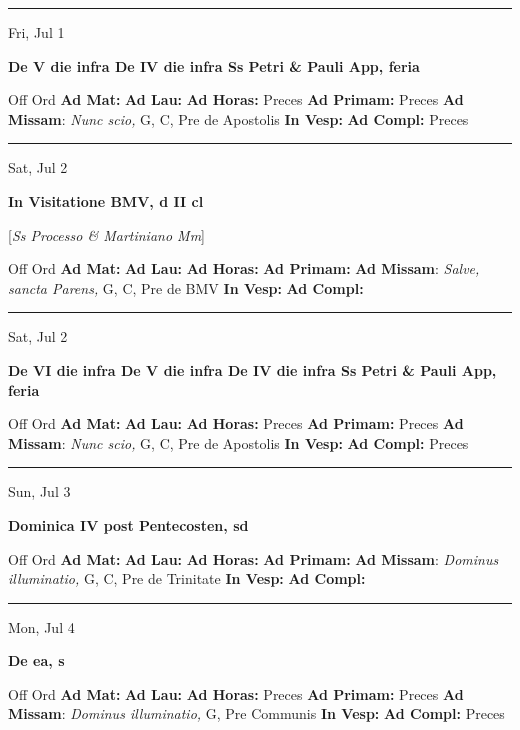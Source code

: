 \documentclass[letterpaper, 10pt]{article}
\begin{document}
\hrule
\begin{center}
Fri, Jul 1
\end{center}\textbf{ \large De V die infra De IV die infra Ss Petri \& Pauli App, \textnormal{\normalsize feria}}
\begin{justify}
Off Ord
\textbf{Ad Mat: }
\textbf{Ad Lau: }
\textbf{Ad Horas: }Preces
\textbf{Ad Primam: }Preces
\textbf{Ad Missam}: \textit{Nunc scio,} G, C, Pre de Apostolis
\textbf{In Vesp: }
\textbf{Ad Compl: }Preces\end{justify}



\hrule
\begin{center}
Sat, Jul 2
\end{center}\textbf{ \large In Visitatione BMV, \textnormal{\normalsize d II cl}}

[\textit{Ss Processo \& Martiniano Mm}]
\begin{justify}
Off Ord
\textbf{Ad Mat: }
\textbf{Ad Lau: }
\textbf{Ad Horas: }
\textbf{Ad Primam: }
\textbf{Ad Missam}: \textit{Salve, sancta Parens,} G, C, Pre de BMV
\textbf{In Vesp: }
\textbf{Ad Compl: }\end{justify}



\hrule
\begin{center}
Sat, Jul 2
\end{center}\textbf{ \large De VI die infra De V die infra De IV die infra Ss Petri \& Pauli App, \textnormal{\normalsize feria}}
\begin{justify}
Off Ord
\textbf{Ad Mat: }
\textbf{Ad Lau: }
\textbf{Ad Horas: }Preces
\textbf{Ad Primam: }Preces
\textbf{Ad Missam}: \textit{Nunc scio,} G, C, Pre de Apostolis
\textbf{In Vesp: }
\textbf{Ad Compl: }Preces\end{justify}



\hrule
\begin{center}
Sun, Jul 3
\end{center}\textbf{ \large Dominica IV post Pentecosten, \textnormal{\normalsize sd}}
\begin{justify}
Off Ord
\textbf{Ad Mat: }
\textbf{Ad Lau: }
\textbf{Ad Horas: }
\textbf{Ad Primam: }
\textbf{Ad Missam}: \textit{Dominus illuminatio,} G, C, Pre de Trinitate
\textbf{In Vesp: }
\textbf{Ad Compl: }\end{justify}



\hrule
\begin{center}
Mon, Jul 4
\end{center}\textbf{ \large De ea, \textnormal{\normalsize s}}
\begin{justify}
Off Ord
\textbf{Ad Mat: }
\textbf{Ad Lau: }
\textbf{Ad Horas: }Preces
\textbf{Ad Primam: }Preces
\textbf{Ad Missam}: \textit{Dominus illuminatio,} G, Pre Communis
\textbf{In Vesp: }
\textbf{Ad Compl: }Preces\end{justify}
\end{document}
